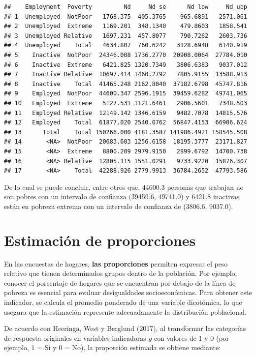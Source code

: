 \documentclass[
  spanish,
  12pt,
]{book}
\begin{document}
\begin{verbatim}
##    Employment  Poverty         Nd     Nd_se      Nd_low     Nd_upp
## 1  Unemployed  NotPoor   1768.375  405.3765    965.6891   2571.061
## 2  Unemployed  Extreme   1169.201  348.1340    479.8603   1858.541
## 3  Unemployed Relative   1697.231  457.8077    790.7262   2603.736
## 4  Unemployed    Total   4634.807  760.6242   3128.6948   6140.919
## 5    Inactive  NotPoor  24346.008 1736.2770  20908.0064  27784.010
## 6    Inactive  Extreme   6421.825 1320.7349   3806.6383   9037.012
## 7    Inactive Relative  10697.414 1460.2792   7805.9155  13588.913
## 8    Inactive    Total  41465.248 2162.8040  37182.6798  45747.816
## 9    Employed  NotPoor  44600.347 2596.1915  39459.6282  49741.065
## 10   Employed  Extreme   5127.531 1121.6461   2906.5601   7348.503
## 11   Employed Relative  12149.142 1346.6159   9482.7078  14815.576
## 12   Employed    Total  61877.020 2540.0762  56847.4153  66906.624
## 13      Total    Total 150266.000 4181.3587 141986.4921 158545.508
## 14       <NA>  NotPoor  20683.603 1256.6158  18195.3777  23171.827
## 15       <NA>  Extreme   8800.209 2979.9150   2899.6792  14700.738
## 16       <NA> Relative  12805.115 1551.0291   9733.9220  15876.307
## 17       <NA>    Total  42288.926 2779.9913  36784.2652  47793.586
\end{verbatim}

De lo cual se puede concluir, entre otros que, 44600.3 personas que trabajan no son pobres con un intervalo de confianza (39459.6, 49741.0) y 6421.8 inactivas están en pobreza extrema con un intervalo de confianza de (3806.6, 9037.0).

\section{Estimación de proporciones}\label{estimaciuxf3n-de-proporciones}

En las encuestas de hogares, \textbf{las proporciones} permiten expresar el peso relativo que tienen determinados grupos dentro de la población. Por ejemplo, conocer el porcentaje de hogares que se encuentran por debajo de la línea de pobreza es esencial para evaluar desigualdades socioeconómicas. Para obtener este indicador, se calcula el promedio ponderado de una variable dicotómica, lo que asegura que la estimación represente adecuadamente la distribución poblacional.

De acuerdo con Heeringa, West y Berglund (2017), al transformar las categorías de respuesta originales en variables indicadoras \(y\) con valores de 1 y 0 (por ejemplo, 1 = Sí y 0 = No), la proporción estimada se obtiene mediante:
\end{document}
